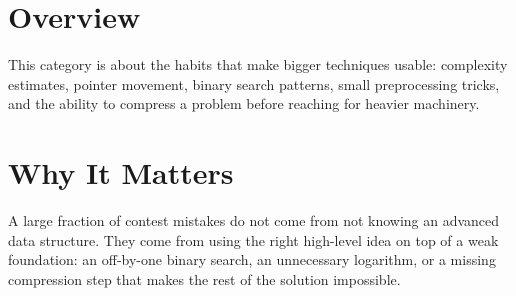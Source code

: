 \section*{Overview}

This category is about the habits that make bigger techniques usable: complexity estimates, pointer movement,
binary search patterns, small preprocessing tricks, and the ability to compress a problem before reaching for
heavier machinery.

\section*{Why It Matters}

A large fraction of contest mistakes do not come from not knowing an advanced data structure. They come from using
the right high-level idea on top of a weak foundation: an off-by-one binary search, an unnecessary logarithm, or a
missing compression step that makes the rest of the solution impossible.
